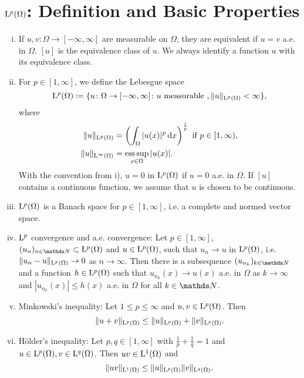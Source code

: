 \section{\texorpdfstring{$\mathrm{L}^p(\Omega)$}{L\textasciicircum p(Omega)}: Definition and Basic Properties}
\label{sec:lpBasics}
\begin{enumerate}[i)]
  \item If $u,v \colon \Omega \to [-\infty,\infty]$ are measurable on $\Omega$, they are equivalent if $u = v$ a.e. in $\Omega$.
    $[u]$ is the equivalence class of $u$.
    We always identify a function $u$ with its equivalence class.
  \item For $p \in [1,\infty]$, we define the Lebesgue space
    $$
    \mathrm{L}^p(\Omega) \coloneqq \{ u \colon \Omega \to [-\infty,\infty] \colon u \text{ measurable }, \|u\|_{\mathrm{L}^p(\Omega)} < \infty \},
    $$
    where
    \begin{align*}
      \|u\|_{\Ell^p(\Omega)} &= \left( \int_\Omega |u(x)|^p \d x \right)^{\frac{1}{p}} \text{ if } p \in [1,\infty), \\
        \|u\|_{\Ell^\infty(\Omega)} &= \esssup_{x \in \Omega} |u(x)|.
    \end{align*}
    With the convention from i), $u = 0$ in $\mathrm{L}^p(\Omega)$ if $u = 0$ a.e. in $\Omega$.
    If $[u]$ contains a continuous function, we assume that $u$ is chosen to be continuous.
  \item $\mathrm{L}^p(\Omega)$ is a Banach space for $p \in [1,\infty]$, i.e. a complete and normed vector space.
  \item $\mathrm{L}^p$ convergence and a.e. convergence: Let $p \in [1,\infty]$, $(u_n)_{n \in \N} \subset \Ell^p(\Omega)$ and $u \in \mathrm{L}^p(\Omega)$, such that $u_n \to u$ in $\mathrm{L}^p(\Omega)$, i.e. $\|u_n - u\|_{\mathrm{L}^p(\Omega)} \to 0$ as $n \to \infty$.
    Then there is a subsequence $(u_{n_k})_{k \in \N}$ and a function $h \in \mathrm{L}^p(\Omega)$ such that $u_{n_k}(x) \to u(x)$ a.e. in $\Omega$ as $k \to \infty$ and $|u_{n_k}(x)| \leq h(x)$ a.e. in $\Omega$ for all $k \in \N$.
  \item Minkowski's inequality: Let $1 \leq p \leq \infty$ and $u,v \in \mathrm{L}^p(\Omega)$.
    Then
    $$
    \|u + v\|_{\mathrm{L}^p(\Omega)} \leq \|u\|_{\mathrm{L}^p(\Omega)}+ \|v\|_{\mathrm{L}^p(\Omega)}.
    $$
  \item Hölder's inequality: Let $p,q \in [1,\infty]$ with $\frac{1}{p} + \frac{1}{q} = 1$ and $u \in \mathrm{L}^p(\Omega), v \in \mathrm{L}^q(\Omega)$. 
    Then $uv \in \mathrm{L}^1(\Omega)$ and
    $$
    \|uv\|_{\mathrm{L}^1(\Omega)} \leq \|u\|_{\mathrm{L}^p(\Omega)} \|v\|_{\mathrm{L}^q(\Omega)}.
$$
\end{enumerate}
